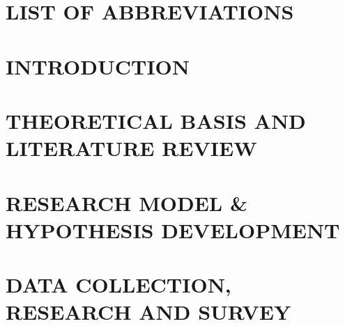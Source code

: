\documentclass[a4paper,12pt,twoside]{extreport}
\theoremstyle{definition}
\begin{document}
\renewcommand{\listfigurename}{LIST OF FIGURES}
{\let\oldnumberline\numberline
	\renewcommand{\numberline}{Figure~\oldnumberline}
	\listoffigures}
\newpage


\renewcommand{\listtablename}{LIST OF TABLES}
{\let\oldnumberline\numberline
	\renewcommand{\numberline}{Table~\oldnumberline}
	\listoftables}

\glsaddall
\renewcommand*{\entryname}{Abbreviation}
\renewcommand*{\descriptionname}{Full Expression}
\chapter*{LIST OF ABBREVIATIONS}
\printnoidxglossary[type=\acronymtype]
\newpage

% 


\newpage
{}

\pagestyle{fancy}
\fancyhf{}
\fancyhead[RE, LO]{\leftmark}
\fancyfoot[RE, LO]{\thepage}

\chapter{INTRODUCTION}
\label{chapter:Introduction}


\newpage
\pagestyle{fancy}
\chapter{THEORETICAL BASIS AND LITERATURE REVIEW}
\label{chapter:Theoretical_basis_and_literature_review}


\newpage
\pagestyle{fancy}
\chapter{RESEARCH MODEL \& HYPOTHESIS DEVELOPMENT}
\label{chapter:Research_model_and_hypothesis_development}


\newpage
\pagestyle{fancy}
\chapter{DATA COLLECTION, RESEARCH AND SURVEY}
\label{chapter:Data_collection_research_and_survey}

\end{document}
